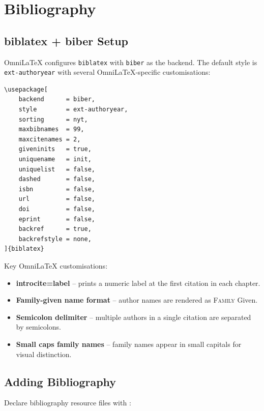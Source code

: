 \chapter{Bibliography}
\label{ch:bibliography}

\section{biblatex + biber Setup}

OmniLaTeX configures \texttt{biblatex} with \texttt{biber} as the backend.
The default style is \texttt{ext-authoryear} with several OmniLaTeX-specific
customisations:

\begin{verbatim}
\usepackage[
    backend      = biber,
    style        = ext-authoryear,
    sorting      = nyt,
    maxbibnames  = 99,
    maxcitenames = 2,
    giveninits   = true,
    uniquename   = init,
    uniquelist   = false,
    dashed       = false,
    isbn         = false,
    url          = false,
    doi          = false,
    eprint       = false,
    backref      = true,
    backrefstyle = none,
]{biblatex}
\end{verbatim}

Key OmniLaTeX customisations:

\begin{itemize}
    \item \textbf{introcite=label} -- prints a numeric label at the first
          citation in each chapter.
    \item \textbf{Family-given name format} -- author names are rendered as
          \textsc{Family} Given.
    \item \textbf{Semicolon delimiter} -- multiple authors in a single
          citation are separated by semicolons.
    \item \textbf{Small caps family names} -- family names appear in small
          capitals for visual distinction.
\end{itemize}

\section{Adding Bibliography}

Declare bibliography resource files with \verb||:

\begin{verbatim}


\end{verbatim}

